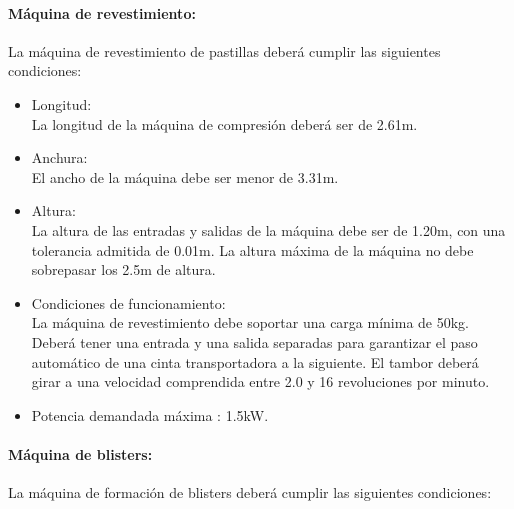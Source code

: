 \paragraph{Máquina de revestimiento:}
		La máquina de revestimiento de pastillas deberá cumplir las siguientes condiciones:
		
		\begin{itemize}
			\item{Longitud:}\\
			La longitud de la máquina de compresión deberá ser de 2.61m. 

			\item{Anchura:}\\
			El ancho de la máquina debe ser menor de 3.31m.
			
			\item{Altura:}\\
			La altura de las entradas y salidas de la máquina debe ser de 1.20m, con una tolerancia admitida de 0.01m.
			La altura máxima de la máquina no debe sobrepasar los 2.5m de altura.
			
			
			\item{Condiciones de funcionamiento: }\\
			La máquina de revestimiento debe soportar una carga mínima de 50kg. Deberá tener una entrada y una salida separadas para garantizar el paso automático de una cinta transportadora a la siguiente. El tambor deberá girar a una velocidad comprendida entre 2.0 y 16 revoluciones por minuto.
			

			\item{Potencia demandada máxima :} 1.5kW.
		
		\end{itemize}



\paragraph{Máquina de blisters:}
		La máquina de formación de blisters deberá cumplir las siguientes condiciones:
		
